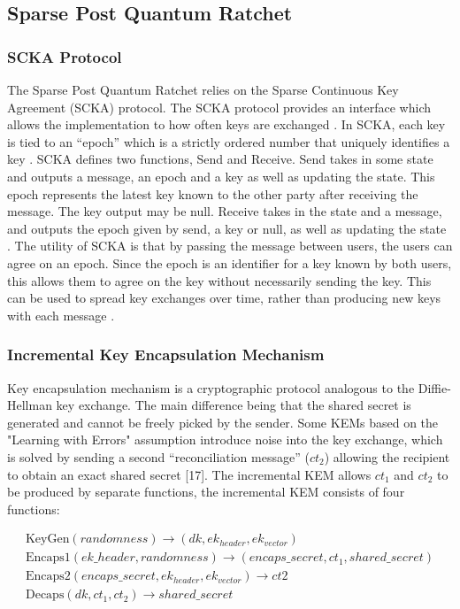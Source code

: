 \subsection{Sparse Post Quantum Ratchet}

 
\subsubsection{SCKA Protocol}


The Sparse Post Quantum Ratchet relies on the Sparse Continuous Key Agreement (SCKA) protocol.
The SCKA protocol provides an interface which allows the implementation to how often keys are exchanged \cite{ref19}.
In SCKA, each key is tied to an “epoch” which is a strictly ordered number that uniquely identifies a key \cite{ref17}.
SCKA defines two functions, Send and Receive. Send takes in some state and outputs a message, an epoch and a key as well as updating the state.
This epoch represents the latest key known to the other party after receiving the message.
The key output may be null. Receive takes in the state and a message, and outputs the epoch given by send, a key or null, as well as updating the state \cite{ref19}.
The utility of SCKA is that by passing the message between users, the users can agree on an epoch.
Since the epoch is an identifier for a key known by both users, this allows them to agree on the key without necessarily sending the key.
This can be used to spread key exchanges over time, rather than producing new keys with each message \cite{ref19}. 

\subsubsection{Incremental Key Encapsulation Mechanism}

Key encapsulation mechanism is a cryptographic protocol analogous to the Diffie-Hellman key exchange.
The main difference being that the shared secret is generated and cannot be freely picked by the sender.
Some KEMs based on the "Learning with Errors" assumption introduce noise into the key exchange, which is solved by sending a second “reconciliation message” ($ct_2$) allowing the recipient to obtain an exact shared secret [17].
The incremental KEM allows $ct_1$ and $ct_2$ to be produced by separate functions, the incremental KEM consists of four functions: 

\begin{align*}
\text{KeyGen}(randomness) \rightarrow (dk, ek_{header}, ek_{vector}) \\
\text{Encaps1}(ek\_header, randomness) \rightarrow (encaps\_secret, ct_1, shared\_secret) \\ 
\text{Encaps2}(encaps\_secret, ek_{header}, ek_{vector}) \rightarrow ct2 \\
\text{Decaps}(dk, ct_1, ct_2) \rightarrow shared\_secret
\end{align*}\cite{ref17}

